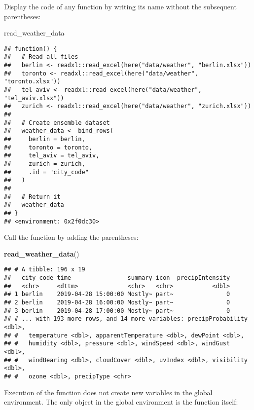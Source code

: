 \documentclass[]{book}
\newenvironment{Shaded}{\begin{snugshade}}{\end{snugshade}}
\newcommand{\KeywordTok}[1]{\textcolor[rgb]{0.13,0.29,0.53}{\textbf{#1}}}
\newcommand{\NormalTok}[1]{#1}
\begin{document}
Display the code of any function by writing its name without the subsequent parentheses:

\begin{Shaded}
\begin{Highlighting}[]
\NormalTok{read_weather_data}
\end{Highlighting}
\end{Shaded}

\begin{verbatim}
## function() {
##   # Read all files
##   berlin <- readxl::read_excel(here("data/weather", "berlin.xlsx"))
##   toronto <- readxl::read_excel(here("data/weather", "toronto.xlsx"))
##   tel_aviv <- readxl::read_excel(here("data/weather", "tel_aviv.xlsx"))
##   zurich <- readxl::read_excel(here("data/weather", "zurich.xlsx"))
## 
##   # Create ensemble dataset
##   weather_data <- bind_rows(
##     berlin = berlin,
##     toronto = toronto,
##     tel_aviv = tel_aviv,
##     zurich = zurich,
##     .id = "city_code"
##   )
## 
##   # Return it
##   weather_data
## }
## <environment: 0x2f0dc30>
\end{verbatim}

Call the function by adding the parentheses:

\begin{Shaded}
\begin{Highlighting}[]
\KeywordTok{read_weather_data}\NormalTok{()}
\end{Highlighting}
\end{Shaded}

\begin{verbatim}
## # A tibble: 196 x 19
##   city_code time                summary icon  precipIntensity
##   <chr>     <dttm>              <chr>   <chr>           <dbl>
## 1 berlin    2019-04-28 15:00:00 Mostly~ part~               0
## 2 berlin    2019-04-28 16:00:00 Mostly~ part~               0
## 3 berlin    2019-04-28 17:00:00 Mostly~ part~               0
## # ... with 193 more rows, and 14 more variables: precipProbability <dbl>,
## #   temperature <dbl>, apparentTemperature <dbl>, dewPoint <dbl>,
## #   humidity <dbl>, pressure <dbl>, windSpeed <dbl>, windGust <dbl>,
## #   windBearing <dbl>, cloudCover <dbl>, uvIndex <dbl>, visibility <dbl>,
## #   ozone <dbl>, precipType <chr>
\end{verbatim}

Execution of the function does not create new variables in the global environment.
The only object in the global environment is the function itself:
\end{document}
